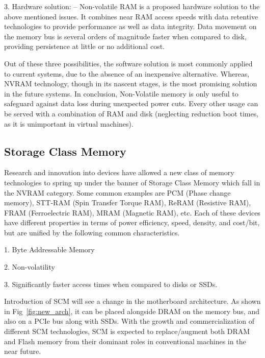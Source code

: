 3. Hardware solution: -- Non-volatile RAM is a proposed hardware solution to the above mentioned issues. It combines near RAM access speeds with data retentive technologies to provide performance as well as data integrity. Data movement on the memory bus is several orders of magnitude faster when compared to disk, providing persistence at little or no additional cost. 

Out of these three possibilities, the software solution is most commonly applied to current systems, due to the absence of an inexpensive alternative. Whereas, NVRAM technology, though in its nascent stages, is the most promising solution in the future systems. In conclusion, Non-Volatile memory is only useful to safeguard against data loss during unexpected power cuts. Every other usage can be served with a combination of RAM and disk (neglecting reduction boot times, as it is unimportant in virtual machines). 

\subsection{Storage Class Memory}

Research and innovation into devices have allowed a new class of memory technologies to spring up under the banner of Storage Class Memory which fall in the NVRAM category. Some common examples are PCM (Phase change memory), STT-RAM (Spin Transfer Torque RAM), ReRAM (Resistive RAM), FRAM (Ferroelectric RAM), MRAM (Magnetic RAM), etc. Each of these devices have different properties in terms of power efficiency, speed, density, and cost/bit, but are unified by the following common characteristics.

1. Byte Addressable Memory

2. Non-volatility

3. Significantly faster access times when compared to disks or SSDs.

Introduction of SCM will see a change in the motherboard architecture. As shown in Fig~\ref{fig:new_arch}, it can be placed alongside DRAM on the memory bus, and also on a PCIe bus along with SSDs. With the growth and commercialization of different SCM technologies, SCM is expected to replace/augment both DRAM and Flash memory from their dominant roles in conventional machines in the near future. 

\setlength{\belowcaptionskip}{-10pt}

